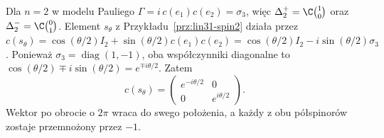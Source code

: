 \begin{przyklad}
Dla $n=2$ w modelu Pauliego
$\Gamma=i\,c(e_1)c(e_2)=\sigma_3$,
więc $\Delta^+_2=\C\binom10$ oraz
$\Delta^-_2=\C\binom01$.
Element $s_\theta$ z Przykładu~\ref{prz:lin31-spin2}
działa przez
$c(s_\theta)=\cos(\theta/2)I_2
+\sin(\theta/2)c(e_1)c(e_2)
=\cos(\theta/2)I_2-i\sin(\theta/2)\sigma_3$.
Ponieważ $\sigma_3=\operatorname{diag}(1,-1)$,
oba współczynniki diagonalne to
$\cos(\theta/2)\mp i\sin(\theta/2)=e^{\mp i\theta/2}$.
Zatem
\[
 c(s_\theta)=
 \begin{pmatrix}
  e^{-i\theta/2}&0\\0&e^{i\theta/2}
 \end{pmatrix}.
\]
Wektor po obrocie o $2\pi$ wraca do swego
położenia, a każdy z obu półspinorów
zostaje przemnożony przez $-1$.
\end{przyklad}


